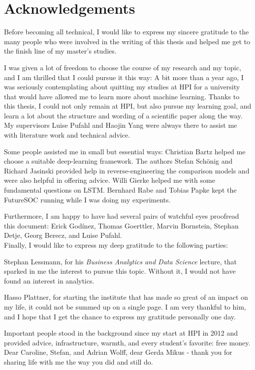 
\begingroup

\let\clearpage\relax
\let\cleardoublepage\relax
\let\cleardoublepage\relax

\chapter*{Acknowledgements}
Before becoming all technical, I would like to express my sincere gratitude to the many people who were involved in the writing of this thesis and helped me get to the finish line of my master's studies.

I was given a lot of freedom to choose the course of my research and my topic, and I am thrilled that I could pursue it this way:
A bit more than a year ago,  I was seriously contemplating about quitting my studies at HPI for a university that would have allowed me to learn more about machine learning.
Thanks to this thesis, I could not only remain at HPI, but also pursue my learning goal, and learn a lot about the structure and wording of a scientific paper along the way. My supervisors Luise Pufahl and Haojin Yang were always there to assist me with literature work and technical advice.

Some people assisted me in small but essential ways:
Christian Bartz helped me choose a suitable deep-learning framework.
The authors Stefan Schönig and Richard Jasinski provided help in reverse-engineering the comparison models and were also helpful in offering advice.
Willi Gierke helped me with some fundamental questions on LSTM.
Bernhard Rabe and Tobias Papke kept the FutureSOC running while I was doing my experiments.

Furthermore, I am happy to have had several pairs of watchful eyes proofread this document:
Erick Godínez, Thomas Goerttler, Marvin Bornstein, Stephan Detje, Georg Berecz, and Luise Pufahl.\\

Finally, I would like to express my deep gratitude to the following parties:

Stephan Lessmann, for his \textit{Business Analytics and Data Science} lecture, that sparked in me the interest to pursue this topic. Without it, I would not have found an interest in analytics.

Hasso Plattner, for starting the institute that has made so great of an impact on my life, it could not be summed up on a single page.
I am very thankful to him, and I hope that I get the chance to express my gratitude personally one day.

Important people stood in the background since my start at HPI in 2012 and provided advice, infrastructure, warmth, and every student's favorite: free money. Dear Caroline, Stefan, and Adrian Wolff, dear Gerda Mikus - thank you for sharing life with me the way you did and still do.
\endgroup
